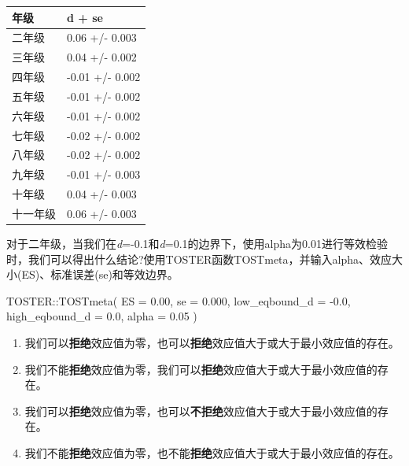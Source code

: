 \documentclass[
  letterpaper,
  DIV=11,
  numbers=noendperiod]{scrreprt}
\newenvironment{Shaded}{\begin{snugshade}}{\end{snugshade}}
\newcommand{\AttributeTok}[1]{\textcolor[rgb]{0.40,0.45,0.13}{#1}}
\newcommand{\FloatTok}[1]{\textcolor[rgb]{0.68,0.00,0.00}{#1}}
\newcommand{\FunctionTok}[1]{\textcolor[rgb]{0.28,0.35,0.67}{#1}}
\newcommand{\NormalTok}[1]{\textcolor[rgb]{0.00,0.23,0.31}{#1}}
\newcommand{\SpecialCharTok}[1]{\textcolor[rgb]{0.37,0.37,0.37}{#1}}
\providecommand{\tightlist}{%
  \setlength{\itemsep}{0pt}\setlength{\parskip}{0pt}}\usepackage{longtable,booktabs,array}
\begin{document}
\begin{longtable}[]{@{}ll@{}}
\toprule\noalign{}
\textbf{年级} & \textbf{d + se} \\
\midrule\noalign{}
\endhead
\bottomrule\noalign{}
\endlastfoot
二年级 & 0.06 +/- 0.003 \\
三年级 & 0.04 +/- 0.002 \\
四年级 & -0.01 +/- 0.002 \\
五年级 & -0.01 +/- 0.002 \\
六年级 & -0.01 +/- 0.002 \\
七年级 & -0.02 +/- 0.002 \\
八年级 & -0.02 +/- 0.002 \\
九年级 & -0.01 +/- 0.003 \\
十年级 & 0.04 +/- 0.003 \\
十一年级 & 0.06 +/- 0.003 \\
\end{longtable}

对于二年级，当我们在\emph{d}=-0.1和\emph{d}=0.1的边界下，使用alpha为0.01进行等效检验时，我们可以得出什么结论?使用TOSTER函数TOSTmeta，并输入alpha、效应大小(ES)、标准误差(se)和等效边界。

\begin{Shaded}
\begin{Highlighting}[]
\NormalTok{TOSTER}\SpecialCharTok{::}\FunctionTok{TOSTmeta}\NormalTok{(}
  \AttributeTok{ES =} \FloatTok{0.00}\NormalTok{,}
  \AttributeTok{se =} \FloatTok{0.000}\NormalTok{,}
  \AttributeTok{low\_eqbound\_d =} \SpecialCharTok{{-}}\FloatTok{0.0}\NormalTok{,}
  \AttributeTok{high\_eqbound\_d =} \FloatTok{0.0}\NormalTok{,}
  \AttributeTok{alpha =} \FloatTok{0.05}
\NormalTok{)}
\end{Highlighting}
\end{Shaded}

\begin{enumerate}
\def\labelenumi{\Alph{enumi})}
\tightlist
\item
  我们可以\textbf{拒绝}效应值为零，也可以\textbf{拒绝}效应值大于或大于最小效应值的存在。
\item
  我们不能\textbf{拒绝}效应值为零，我们可以\textbf{拒绝}效应值大于或大于最小效应值的存在。
\item
  我们可以\textbf{拒绝}效应值为零，也可以\textbf{不拒绝}效应值大于或大于最小效应值的存在。
\item
  我们不能\textbf{拒绝}效应值为零，也不能\textbf{拒绝}效应值大于或大于最小效应值的存在。
\end{enumerate}
\end{document}
